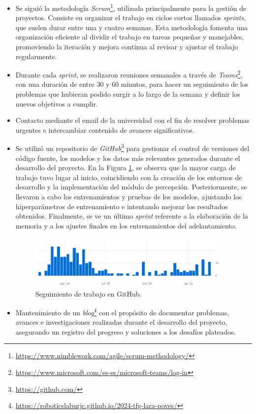 \begin{itemize}
\item Se siguió la metodología \textit{Scrum}\footnote{\url{https://www.nimblework.com/agile/scrum-methodology/}}, utilizada principalmente para la gestión de proyectos. Consiste en organizar el trabajo en ciclos cortos llamados \textit{sprints}, que suelen durar entre una y cuatro semanas. Esta metodología fomenta una organización eficiente al dividir el trabajo en tareas pequeñas y manejables, promoviendo la iteración y mejora continua al revisar y ajustar el trabajo regularmente.
\item Durante cada \textit{sprint}, se realizaron reuniones semanales a través de \textit{Teams}\footnote{\url{https://www.microsoft.com/es-es/microsoft-teams/log-in}}, con una duración de entre 30 y 60 minutos, para hacer un seguimiento de los problemas que hubieran podido surgir a lo largo de la semana y definir los nuevos objetivos a cumplir.
\item Contacto mediante el email de la universidad con el fin de resolver problemas urgentes e intercambiar contenido de avances significativos.
\item Se utilizó un repositorio de \textit{GitHub}\footnote{\url{https://github.com/}} para gestionar el control de versiones del código fuente, los modelos y los datos más relevantes generados durante el desarrollo del proyecto. En la Figura \ref{fig:github}, se observa que la mayor carga de trabajo tuvo lugar al inicio, coincidiendo con la creación de los entornos de desarrollo y la implementación del módulo de percepción. Posteriormente, se llevaron a cabo los entrenamientos y pruebas de los modelos, ajustando los hiperparámetros de entrenamiento e intentando mejorar los resultados obtenidos. Finalmente, se ve un último \textit{sprint} referente a la elaboración de la memoria y a los ajustes finales en los entrenamientos del adelantamiento.

\begin{figure}[ht]
\centering
\includegraphics[width=10cm]{figs/objetivos/github.png}
\caption{Seguimiento de trabajo en GitHub.}
\label{fig:github}
\end{figure}

\item Mantenimiento de un \textit{blog}\footnote{\url{https://roboticslaburjc.github.io/2024-tfg-lara-poves/}} con el propósito de documentar problemas, avances e investigaciones realizadas durante el desarrollo del proyecto, asegurando un registro del progreso y soluciones a los desafíos plateados.

\end{itemize}

